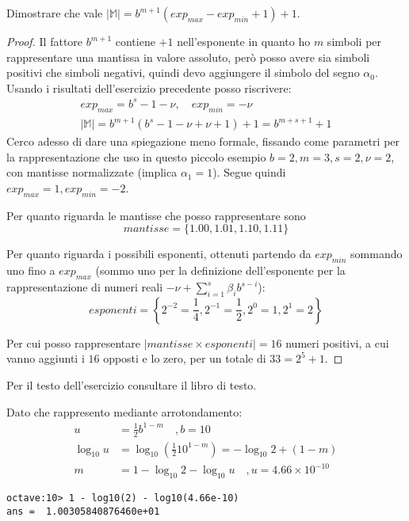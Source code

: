 \begin{exercise}
Dimostrare che vale $|\mathbb{M}| = b^{m+1}(exp_{max} - exp_{min} + 1) + 1$.
\end{exercise}
\begin{proof}
Il fattore $b^{m+1}$ contiene $+1$ nell'esponente in quanto ho $m$ simboli per
rappresentare una mantissa in valore assoluto, per\`o posso avere sia simboli positivi
che simboli negativi, quindi devo aggiungere il simbolo del segno $\alpha_{0}$.
Usando i risultati dell'esercizio precedente posso riscrivere:
\begin{displaymath}
\begin{split}
	exp_{max} = b^{s} - 1 - \nu, \quad exp_{min} = -\nu \\
	|\mathbb{M}| = b^{m+1}(b^{s} - 1 - \nu + \nu + 1) + 1 = b^{m+s+1} + 1
\end{split}
\end{displaymath}
Cerco adesso di dare una spiegazione meno formale, fissando come parametri per
la rappresentazione che uso in questo piccolo esempio $b = 2, m = 3, s = 2, \nu = 2$,
con mantisse normalizzate (implica $\alpha_{1} = 1$).
Segue quindi $exp_{max} = 1, exp_{min} = -2$. 

Per quanto riguarda le mantisse che posso rappresentare sono 
$$mantisse = \lbrace 1.00, 1.01, 1.10, 1.11 \rbrace$$

Per quanto riguarda i possibili esponenti, ottenuti partendo da $exp_{min}$ sommando
uno fino a $exp_{max}$ (sommo uno per la definizione dell'esponente per la rappresentazione
di numeri reali $-\nu + \sum_{i = 1}^{s}{\beta_{i} b^{s - i}}$):
$$esponenti = \left \lbrace 2^{-2} = \frac{1}{4}, 2^{-1} = \frac{1}{2},
		2^{0} = 1, 2^{1} = 2 \right \rbrace$$

Per cui posso rappresentare $|mantisse \times esponenti| = 16$ numeri positivi, 
a cui vanno aggiunti i $16$ opposti e lo zero, per un totale di $33 = 2^{5} + 1$.
\end{proof}

\begin{exercise}[1.8]
Per il testo dell'esercizio consultare il libro di testo.
\end{exercise}
Dato che rappresento mediante arrotondamento:
\begin{displaymath}
\begin{split}
u &= \frac{1}{2}b^{1-m} \quad , b = 10 \\
\log_{10}{u} &= \log_{10}{\left ( \frac{1}{2}10^{1-m} \right )} = -\log_{10}{2} + (1 - m) \\
m &= 1 - \log_{10}{2} - \log_{10}{u} \quad , u = 4.66 \times 10^{-10}
\end{split}
\end{displaymath}
\begin{lstlisting}
octave:10> 1 - log10(2) - log10(4.66e-10)
ans =  1.00305840876460e+01
\end{lstlisting}

